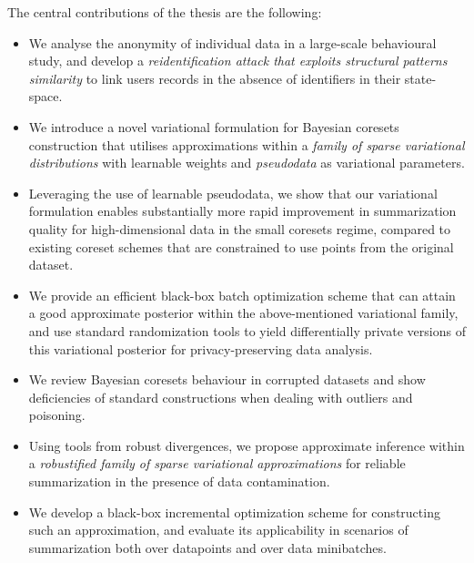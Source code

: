 The central contributions of the thesis are the following:

\begin{itemize}
	\item We analyse the anonymity of individual data in a large-scale behavioural study, and develop a \emph{reidentification attack that exploits structural patterns similarity} to link users records in the absence of identifiers in their state-space.
	\item We introduce a novel variational formulation for Bayesian coresets construction that utilises approximations within a \emph{family of sparse variational distributions} with learnable weights and \emph{pseudodata} as variational parameters.
	\item Leveraging the use of learnable pseudodata, we show that our variational formulation enables substantially more rapid improvement in summarization quality for high-dimensional data in the small coresets regime, compared to existing coreset schemes that are constrained to use points from the original dataset. 
	\item We provide an efficient black-box batch optimization scheme that can attain a good approximate posterior within the above-mentioned variational family, and use standard randomization tools to yield differentially private versions of this variational posterior for privacy-preserving data analysis.
	\item We review Bayesian coresets behaviour in corrupted datasets and show deficiencies of standard constructions when dealing with outliers and poisoning.
	\item Using tools from robust divergences, we propose approximate inference within a \emph{robustified family of sparse variational approximations} for reliable summarization in the presence of data contamination.
	\item We develop a black-box incremental optimization scheme for constructing such an approximation, and evaluate its applicability in scenarios of summarization both over datapoints and over data minibatches.
\end{itemize}

